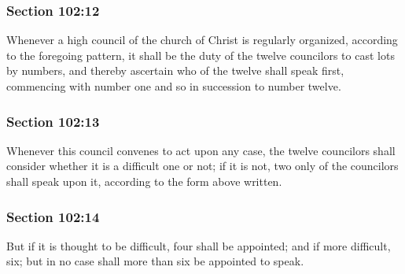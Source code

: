 	\subsubsection{Section 102:12} %
		\label{DC102-12}

		Whenever a high council of the church of Christ is regularly organized, according to the foregoing pattern, it shall be the duty of the twelve councilors to cast lots by numbers, and thereby ascertain who of the twelve shall speak first, commencing with number one and so in succession to number twelve.


	\subsubsection{Section 102:13} %
		\label{DC102-13}

		Whenever this council convenes to act upon any case, the twelve councilors shall consider whether it is a difficult one or not; if it is not, two only of the councilors shall speak upon it, according to the form above written.


	\subsubsection{Section 102:14} %
		\label{DC102-14}

		But if it is thought to be difficult, four shall be appointed; and if more difficult, six; but in no case shall more than six be appointed to speak.

